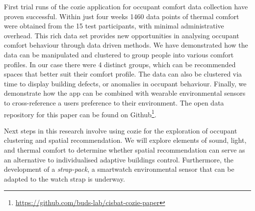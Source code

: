 
First trial runs of the cozie application for occupant comfort data collection have proven successful. Within just four weeks 1460 data points of thermal comfort were obtained from the 15 test participants, with minimal administrative overhead. This rich data set provides new opportunities in analysing occupant comfort behaviour through data driven methods. We have demonstrated how the data can be manipulated and clustered to group people into various comfort profiles. In our case there were 4 distinct groups, which can be recommended spaces that better suit their comfort profile. The data can also be clustered via time to display building defects, or anomalies in occupant behaviour. Finally, we demonstrate how the app can be combined with wearable environmental sensors to cross-reference a users preference to their environment. The open data repository for this paper can be found on Github\footnote{\url{https://github.com/buds-lab/cisbat-cozie-paper}}.

Next steps in this research involve using cozie for the exploration of occupant clustering and spatial recommendation. We will explore elements of sound, light, and thermal comfort to determine whether spatial recommendation can serve as an alternative to individualised adaptive buildings control. Furthermore, the development of a \emph{strap-pack}, a smartwatch environmental sensor that can be adapted to the watch strap is underway. 
